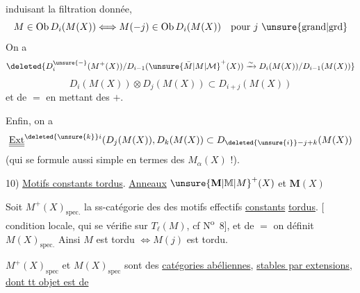 induisant la filtration donnée, 
\[
M\in\mathrm{Ob}\,D_i(M(X))\Longleftrightarrow M(-j)\in\mathrm{Ob}\,D_i(M(X))\quad\text{pour $j$ \unsure{grand|grd}}
\]
On a
\[
\deleted{D_i^{\unsure{-}}(M^+(X))/D_{i-1}(\unsure{\bar M|M|\mathcal M}^+(X))\xrightarrow{\sim}D_i(M(X))/D_{i-1}(M(X))}
\]
\[
D_i(M(X))\otimes D_j(M(X))\subset D_{i+j}(M(X))
\]
et de $=$ en mettant des $+$. 

Enfin, on a
\[
\underline{\underline{\mathrm{Ext}}}^{\deleted{\unsure{k}}i}(D_j(M(X)),D_k(M(X))\subset D_{\deleted{\unsure{i}}-j+k}(M(X))
\]
(qui se formule aussi simple en termes des $M_{\alpha}(X)$ !).

10) \uline{Motifs constants tordus}. \uline{Anneaux} $\unsure{\mathbf M|\mathbb M|M}^+(X)$ et $\mathbf M(X)$

Soit $M^+(X)_{\mathrm{spec.}}$ la ss-catégorie des des motifs effectifs \uline{constants} \uline{tordus}.
[ condition locale, qui se vérifie sur $T_\ell(M)$, cf N\textsuperscript{o}~8], et de $=$ on définit $M(X)_{\mathrm{spec.}}$  Ainsi $M$ est tordu $\Longleftrightarrow M(j)$ est tordu.

$M^+(X)_{\mathrm{spec}}$ et $M(X)_{\mathrm{spec}}$ sont des \uline{catégories abéliennes}, \uline{stables par extensions}, \uline{dont tt objet est de}
